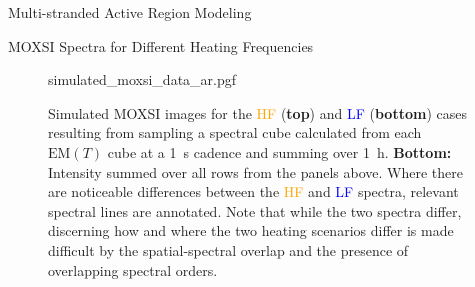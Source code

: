 \documentclass[final]{beamer}
\newlength{\colwidth}
\begin{document}
\begin{frame}[t]
\begin{columns}[t]
\begin{column}{\colwidth}
\begin{block}{Multi-stranded Active Region Modeling}
  \end{block}

  \vspace{-35px}

  \begin{block}{MOXSI Spectra for Different Heating Frequencies}

    \begin{figure}
      \centering
      {simulated_moxsi_data_ar.pgf}
      \caption{Simulated MOXSI images for the \textcolor{orange}{HF} (\textbf{top}) and \textcolor{blue}{LF} (\textbf{bottom}) cases resulting from sampling a spectral cube calculated from each $\mathrm{EM}(T)$ cube at a \SI{1}{\second} cadence and summing over \SI{1}{\hour}. \textbf{Bottom:} Intensity summed over all rows from the panels above. Where there are noticeable differences between the \textcolor{orange}{HF} and \textcolor{blue}{LF} spectra, relevant spectral lines are annotated. Note that while the two spectra differ, \alert{discerning how and where the two heating scenarios differ is made difficult by the spatial-spectral overlap and the presence of overlapping spectral orders.}}
      \label{fig:simulated_moxsi_spectra}
    \end{figure}

  \end{block}

  \vspace{-35px}


\end{column}
\end{columns}
\end{frame}
\end{document}
